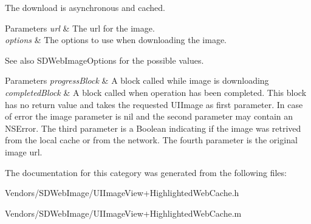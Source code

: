 The download is asynchronous and cached.


\begin{DoxyParams}{Parameters}
{\em url} & The url for the image. \\
\hline
{\em options} & The options to use when downloading the image. \\
\hline
\end{DoxyParams}
\begin{DoxySeeAlso}{See also}
S\+D\+Web\+Image\+Options for the possible values. 
\end{DoxySeeAlso}

\begin{DoxyParams}{Parameters}
{\em progress\+Block} & A block called while image is downloading \\
\hline
{\em completed\+Block} & A block called when operation has been completed. This block has no return value and takes the requested U\+I\+Image as first parameter. In case of error the image parameter is nil and the second parameter may contain an N\+S\+Error. The third parameter is a Boolean indicating if the image was retrived from the local cache or from the network. The fourth parameter is the original image url. \\
\hline
\end{DoxyParams}


The documentation for this category was generated from the following files\+:\begin{DoxyCompactItemize}
\item 
Vendors/\+S\+D\+Web\+Image/U\+I\+Image\+View+\+Highlighted\+Web\+Cache.\+h\item 
Vendors/\+S\+D\+Web\+Image/U\+I\+Image\+View+\+Highlighted\+Web\+Cache.\+m\end{DoxyCompactItemize}
